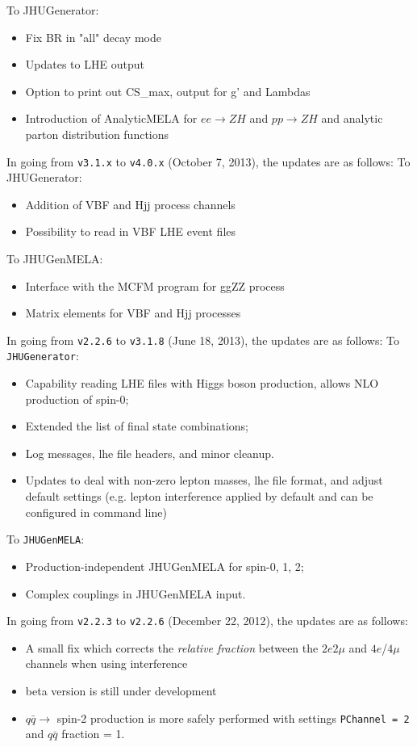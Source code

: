 \documentclass[aps,superscriptaddress,nofootinbib]{revtex4}
\begin{document}
To JHUGenerator:
\begin{itemize}
\item Fix BR in "all" decay mode
\item Updates to LHE output
\item Option to print out CS\_max, output for g' and Lambdas
\item Introduction of AnalyticMELA for $ee \to ZH$ and $pp \to ZH$ and analytic parton distribution functions
\end{itemize}
\noindent
In going from \verb|v3.1.x| to \verb|v4.0.x| (October 7, 2013), the updates are as follows:
To JHUGenerator:
\begin{itemize}
\item Addition of VBF and Hjj process channels
\item Possibility to read in VBF LHE event files
\end{itemize}
To JHUGenMELA:
\begin{itemize}
\item Interface with the MCFM program for ggZZ process
\item Matrix elements for VBF and Hjj processes
\end{itemize}
\noindent
In going from \verb|v2.2.6| to \verb|v3.1.8| (June 18, 2013), the updates are as follows:
To \verb|JHUGenerator|:
\begin{itemize}
\item Capability reading LHE files with Higgs boson production, allows NLO production of spin-0;
\item Extended the list of final state combinations;
\item Log messages, lhe file headers, and minor cleanup.
\item Updates to deal with non-zero lepton masses, lhe file format, and adjust default settings (e.g. lepton interference applied by default and can be configured in command line)
\end{itemize}
To \verb|JHUGenMELA|:
\begin{itemize}
\item Production-independent JHUGenMELA for spin-0, 1, 2;
\item Complex couplings in JHUGenMELA input.
\end{itemize}
\noindent
In going from \verb|v2.2.3| to \verb|v2.2.6| (December 22, 2012), the updates are as follows:
\begin{itemize}
\item A small fix which corrects the {\it relative fraction} between the $2e2\mu$ and $4e$/$4\mu$ channels when using interference
\item beta version is still under development
\item $q\bar{q} \to$ spin-2 production is more safely performed with settings \verb|PChannel = 2| and $q\bar{q}$ fraction = 1.
\end{itemize}
\end{document}
